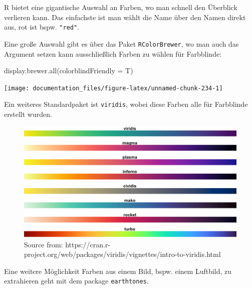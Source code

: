 \documentclass[
]{article}
\newenvironment{Shaded}{\begin{snugshade}}{\end{snugshade}}
\newcommand{\AttributeTok}[1]{\textcolor[rgb]{0.77,0.63,0.00}{#1}}
\newcommand{\FunctionTok}[1]{\textcolor[rgb]{0.00,0.00,0.00}{#1}}
\newcommand{\NormalTok}[1]{#1}
\begin{document}
R bietet eine gigantische Auswahl an Farben, wo man schnell den Überblick verlieren kann.
Das einfachste ist man wählt die Name über den Namen direkt aus, rot ist bspw. \texttt{"red"}.

Eine große Auswahl gibt es über das Paket \texttt{RColorBrewer}, wo man auch das Argument setzen kann ausschließlich Farben zu wählen für Farbblinde:

\begin{Shaded}
\begin{Highlighting}[]
\FunctionTok{display.brewer.all}\NormalTok{(}\AttributeTok{colorblindFriendly =}\NormalTok{ T)}
\end{Highlighting}
\end{Shaded}

\begin{center}\texttt{[image: documentation\_files/figure-latex/unnamed-chunk-234-1]} \end{center}

Ein weiteres Standardpaket ist \texttt{viridis}, wobei diese Farben alle für Farbblinde erstellt wurden.

\begin{figure}

{\centering \includegraphics[width=22.81in]{images/061} 

}

\caption{Source from: https://cran.r-project.org/web/packages/viridis/vignettes/intro-to-viridis.html}\label{fig:unnamed-chunk-235}
\end{figure}

Eine weitere Möglichkeit Farben aus einem Bild, bspw. einem Luftbild, zu extrahieren geht mit dem package \texttt{earthtones}.
\end{document}
